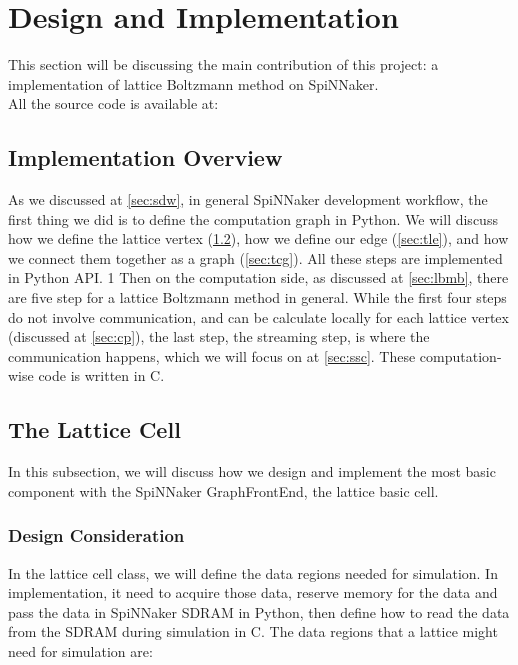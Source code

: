 

\newpage
\section{Design and Implementation} \label{sec:dai}
This section will be discussing the main contribution of this project: a implementation of lattice Boltzmann method on SpiNNaker.  \\

All the source code is available at: \cite{spinn_lb}
\subsection{Implementation Overview}

As we discussed at \ref{sec:sdw}, in general SpiNNaker development workflow, the first thing we did is to define the computation graph in Python. We will discuss how we define the lattice vertex (\ref{sec:tlc}), how we define our edge (\ref{sec:tle}), and how we connect them together as a graph (\ref{sec:tcg}). All these steps are implemented in Python API.
1       
Then on the computation side, as discussed at \ref{sec:lbmb}, there are five step for a lattice Boltzmann method in general. While the first four steps do not involve communication, and can be calculate locally for each lattice vertex (discussed at \ref{sec:cp}), the last step, the streaming step, is where the communication happens, which we will focus on at \ref{sec:ssc}. These computation-wise code is written in C.

\subsection{The Lattice Cell} \label{sec:tlc}
In this subsection, we will discuss how we design and implement the most basic component with the SpiNNaker GraphFrontEnd, the lattice basic cell.
\subsubsection{Design Consideration} \label{sec:tlcdc}
In the lattice cell class, we will define the data regions needed for simulation. In implementation, it need to acquire those data, reserve memory for the data and pass the data in SpiNNaker SDRAM in Python, then define how to read the data from the SDRAM during simulation in C. The data regions that a lattice might need for simulation are: \\

